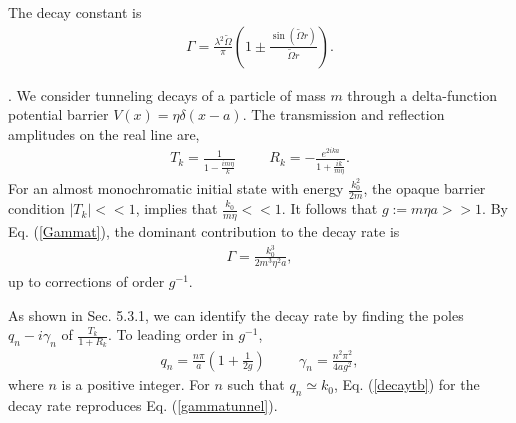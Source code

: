 \documentclass[12pt]{article}
\numberwithin{equation}{section}
\begin{document}
\begin{appendix}
  The  decay constant is
\begin{eqnarray}
\Gamma = \frac{\lambda^2\tilde{\Omega}}{ \pi} (1 \pm \frac{\sin (\tilde{\Omega} r)}{\tilde{\Omega}r}).
\end{eqnarray}

 \bigskip

. We consider  tunneling decays of a particle of mass $m$  through a delta-function potential barrier $V(x) = \eta \delta(x-a)$. The transmission and reflection amplitudes on the real line are,
\begin{eqnarray}
T_k = \frac{1}{1 - \frac{im\eta}{k}} \hspace{1cm} R_k = - \frac{e^{2ika}}{1+ \frac{ik}{m\eta}}.
\end{eqnarray}
For an almost monochromatic initial state with  energy $\frac{k_0^2}{2m}$, the opaque barrier condition $|T_k|<<1$, implies that $\frac{k_0}{m \eta} << 1$. It follows that $g :=  m \eta a >> 1$.
By Eq. (\ref{Gammat}), the dominant contribution to the decay rate is
\begin{eqnarray}
\Gamma = \frac{k_0^3}{2m^3 \eta^2a}, \label{gammatunnel}
\end{eqnarray}
up to corrections of order $g^{-1}$.

As shown in Sec. 5.3.1, we can identify the decay rate by finding the poles $q_n - i \gamma_n$ of $\frac{T_k}{1+R_k}$. To leading order in $g^{-1}$,
\begin{eqnarray}
q_n = \frac{n\pi}{a}( 1 + \frac{1}{2g}) \hspace{1cm} \gamma_n = \frac{n^2\pi^2}{4 a g^2},
\end{eqnarray}
where $n$ is a positive integer. For $n$ such that $q_n \simeq  k_0$, Eq. (\ref{decaytb}) for the decay rate reproduces Eq. (\ref{gammatunnel}).


\end{appendix}


 
\end{document}
